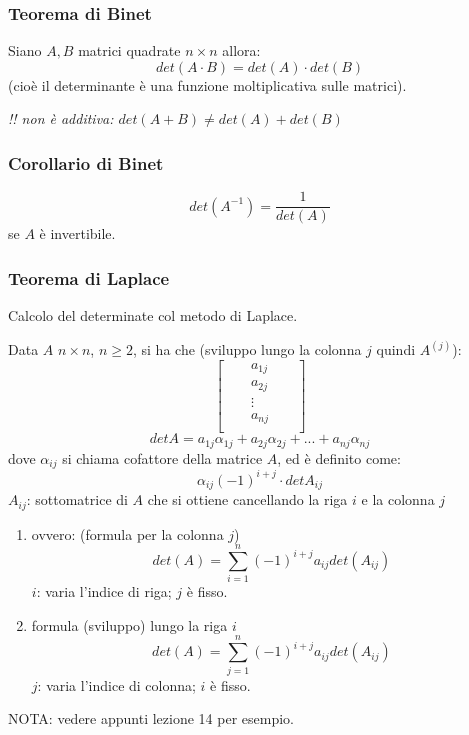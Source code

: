   \subsubsection{Teorema di Binet}
  Siano $A,B$ matrici quadrate $n\times n$ allora:
  \[det(A\cdot B)=det(A)\cdot det(B)\]
  (cioè il determinante è una funzione moltiplicativa sulle matrici).

  \textit{!! non è additiva: $det(A+B)\neq det(A)+det(B)$}

  \subsubsection{Corollario di Binet}

  \[det(A^{-1})=\frac{1}{det(A)}\]
  se $A$ è invertibile.

  \subsubsection{Teorema di Laplace}
  Calcolo del determinate col metodo di Laplace.

  Data $A$ $n\times n$, $n\geq 2$, si ha che (sviluppo lungo la colonna $j$ quindi $A^{(j)}$):
\[
  \begin{bmatrix}
    &&a_{1j}&&\\
    &&a_{2j}&&\\
    &&\vdots&&\\
    &&a_{nj}&&\\
  \end{bmatrix}
\]
\[detA= a_{1j}\alpha_{1j}+a_{2j}\alpha_{2j}+...+a_{nj}\alpha_{nj}\]
dove $\alpha_{ij}$ si chiama cofattore della matrice $A$, ed è definito come:
\[\alpha_{ij}(-1)^{i+j}\cdot detA_{ij}\]
$A_{ij}$: sottomatrice di $A$ che si ottiene cancellando la riga $i$ e la colonna $j$
\begin{enumerate}
  \item ovvero: (formula per la colonna $j$)
  \[det(A)=\sum_{i=1}^n(-1)^{i+j}a_{ij}det(A_{ij})\]
  $i$: varia l'indice di riga; $j$ è fisso.
\item formula (sviluppo) lungo la riga $i$
  \[det(A)=\sum_{j=1}^n(-1)^{i+j}a_{ij}det(A_{ij})\]
  $j$: varia l'indice di colonna; $i$ è fisso.

\end{enumerate}
NOTA: vedere appunti lezione 14 per esempio.

